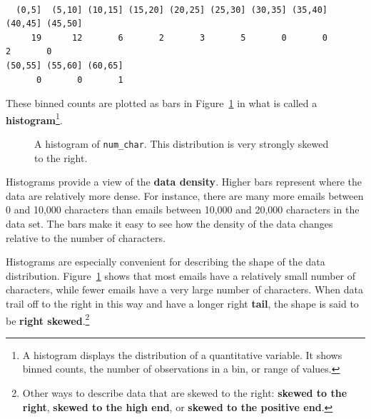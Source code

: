 \documentclass[
  letterpaper,
  DIV=11,
  numbers=noendperiod]{scrreprt}
\begin{document}
\begin{verbatim}

  (0,5]  (5,10] (10,15] (15,20] (20,25] (25,30] (30,35] (35,40] (40,45] (45,50] 
     19      12       6       2       3       5       0       0       2       0 
(50,55] (55,60] (60,65] 
      0       0       1 
\end{verbatim}

These binned counts are plotted as bars in Figure~\ref{fig-hist5} in
what is called a \textbf{histogram}\footnote{A histogram displays the
  distribution of a quantitative variable. It shows binned counts, the
  number of observations in a bin, or range of values.}.

\begin{figure}


\caption{\label{fig-hist5}A histogram of \texttt{num\_char}. This
distribution is very strongly skewed to the right.}

\end{figure}%

Histograms provide a view of the \textbf{data density}. Higher bars
represent where the data are relatively more dense. For instance, there
are many more emails between 0 and 10,000 characters than emails between
10,000 and 20,000 characters in the data set. The bars make it easy to
see how the density of the data changes relative to the number of
characters.

Histograms are especially convenient for describing the shape of the
data distribution. Figure~\ref{fig-hist5} shows that most emails have a
relatively small number of characters, while fewer emails have a very
large number of characters. When data trail off to the right in this way
and have a longer right \textbf{tail}, the shape is said to be
\textbf{right skewed}.\footnote{Other ways to describe data that are
  skewed to the right: \textbf{skewed to the right}, \textbf{skewed to
  the high end}, or \textbf{skewed to the positive end}.}
\end{document}
